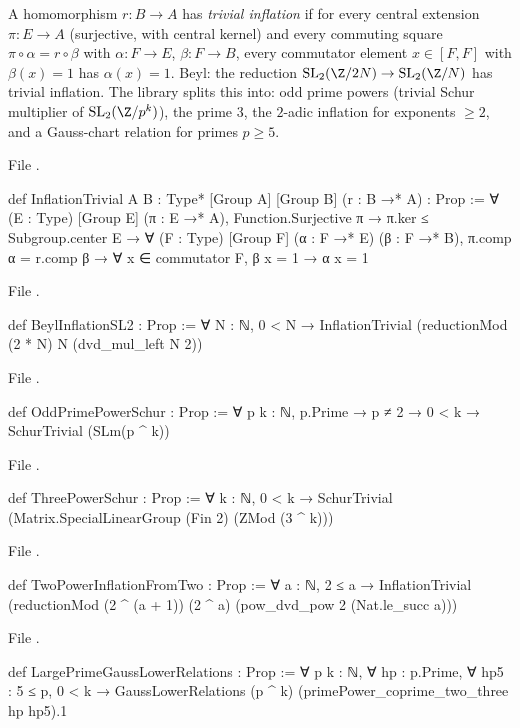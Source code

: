 \begin{definition}\label{l21:def:beyl}
A homomorphism $r:B\to A$ has \emph{trivial inflation} if for every central extension $\pi:E\to A$ (surjective, with
central kernel) and every commuting square $\pi\circ\alpha=r\circ\beta$ with $\alpha:F\to E$, $\beta:F\to B$, every
commutator element $x\in[F,F]$ with $\beta(x)=1$ has $\alpha(x)=1$. Beyl: the reduction
$\ltwooneSL(\Z/2N)\to\ltwooneSL(\Z/N)$ has trivial inflation. The library splits this into: odd prime powers (trivial Schur
multiplier of $\ltwooneSL(\Z/p^k)$), the prime $3$, the $2$-adic inflation for exponents $\ge2$, and a Gauss-chart relation for
primes $p\ge5$.
\end{definition}
\noindent File .
\begin{leancode}
def InflationTrivial {A B : Type*} [Group A] [Group B] (r : B →* A) : Prop :=
  ∀ (E : Type) [Group E] (π : E →* A), Function.Surjective π → π.ker ≤ Subgroup.center E →
    ∀ (F : Type) [Group F] (α : F →* E) (β : F →* B), π.comp α = r.comp β →
      ∀ x ∈ commutator F, β x = 1 → α x = 1
\end{leancode}
\noindent File .
\begin{leancode}
def BeylInflationSL2 : Prop :=
  ∀ N : ℕ, 0 < N → InflationTrivial (reductionMod (2 * N) N (dvd_mul_left N 2))
\end{leancode}
\noindent File .
\begin{leancode}
def OddPrimePowerSchur : Prop :=
  ∀ p k : ℕ, p.Prime → p ≠ 2 → 0 < k → SchurTrivial (SLm(p ^ k))
\end{leancode}
\noindent File .
\begin{leancode}
def ThreePowerSchur : Prop :=
  ∀ k : ℕ, 0 < k → SchurTrivial (Matrix.SpecialLinearGroup (Fin 2) (ZMod (3 ^ k)))
\end{leancode}
\noindent File .
\begin{leancode}
def TwoPowerInflationFromTwo : Prop :=
  ∀ a : ℕ, 2 ≤ a → InflationTrivial
    (reductionMod (2 ^ (a + 1)) (2 ^ a) (pow_dvd_pow 2 (Nat.le_succ a)))
\end{leancode}
\noindent File .
\begin{leancode}
def LargePrimeGaussLowerRelations : Prop :=
  ∀ p k : ℕ, ∀ hp : p.Prime, ∀ hp5 : 5 ≤ p, 0 < k →
    GaussLowerRelations (p ^ k) (primePower_coprime_two_three hp hp5).1
\end{leancode}

